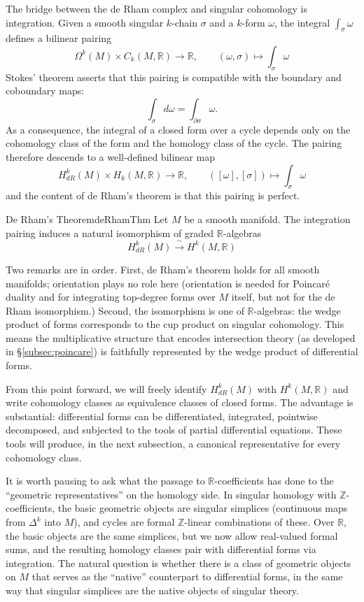 \documentclass{article}
\newcommand{\R}{\mathbb{R}}
\newcommand{\Z}{{\mathbb{Z}}}
\begin{document}
The bridge between the de Rham complex and singular cohomology is integration.
Given a smooth singular $k$-chain $\sigma$ and a $k$-form $\omega$, the
integral $\int_\sigma \omega$ defines a bilinear pairing
\[
  \Omega^k(M) \times C_k(M, \R) \longrightarrow \R,
  \qquad (\omega, \sigma) \longmapsto \int_\sigma \omega
\]
Stokes' theorem asserts that this pairing is compatible with the boundary and
coboundary maps:
\[
  \int_\sigma d\omega = \int_{\partial \sigma} \omega.
\]
As a consequence, the integral of a closed form over a cycle depends only on
the cohomology class of the form and the homology class of the cycle. The
pairing therefore descends to a well-defined bilinear map
\[
  H^k_{dR}(M) \times H_k(M, \R) \longrightarrow \R,
  \qquad ([\omega], [\sigma]) \longmapsto \int_\sigma \omega
\]
and the content of de Rham's theorem is that this pairing is perfect.

\begin{thm}{De Rham's Theorem}{deRhamThm}
  Let $M$ be a smooth manifold. The integration pairing induces a natural
  isomorphism of graded $\R$-algebras
  \[
    H^k_{dR}(M) \xrightarrow{\;\sim\;} H^k(M, \R)
  \]
\end{thm}

Two remarks are in order. First, de Rham's theorem holds for all smooth
manifolds; orientation plays no role here (orientation is needed for
Poincar\'{e} duality and for integrating top-degree forms over $M$ itself, but
not for the de Rham isomorphism.) Second, the isomorphism is one of
$\R$-algebras: the wedge product of forms corresponds to the cup product on
singular cohomology. This means the multiplicative structure that encodes
intersection theory (as developed in \S\ref{subsec:poincare}) is faithfully
represented by the wedge product of differential forms.

From this point forward, we will freely identify $H^k_{dR}(M)$ with
$H^k(M, \R)$ and write cohomology classes as equivalence classes of closed
forms. The advantage is substantial: differential forms can be differentiated,
integrated, pointwise decomposed, and subjected to the tools of partial
differential equations. These tools will produce, in the next subsection, a
canonical representative for every cohomology class.

It is worth pausing to ask what the passage to $\R$-coefficients has done to
the ``geometric representatives'' on the homology side. In singular homology
with $\Z$-coefficients, the basic geometric objects are singular simplices
(continuous maps from $\Delta^k$ into $M$), and cycles are formal
$\Z$-linear combinations of these. Over $\R$, the basic objects are the same
simplices, but we now allow real-valued formal sums, and the resulting
homology classes pair with differential forms via integration. The natural
question is whether there is a class of geometric objects on $M$ that serves
as the ``native'' counterpart to differential forms, in the same way that
singular simplices are the native objects of singular theory.
\end{document}
